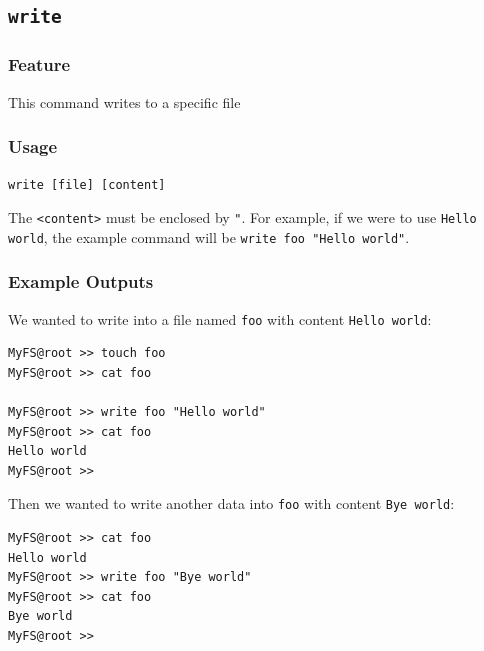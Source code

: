 \documentclass{homework}
\begin{document}
\subsection{\texttt{write}}
\subsubsection{Feature}
This command writes to a specific file
\subsubsection{Usage}
\begin{center}
\texttt{write [file] [content]}
\end{center}
The \texttt{<content>} must be enclosed by \texttt{"}. For example, if we were to use \texttt{Hello world}, the example command will be \texttt{write foo "Hello world"}.
\subsubsection{Example Outputs}
We wanted to write into a file named \texttt{foo} with content \texttt{Hello world}:
\\
\begin{center}
\begin{code}
\begin{verbatim}
MyFS@root >> touch foo
MyFS@root >> cat foo

MyFS@root >> write foo "Hello world"
MyFS@root >> cat foo
Hello world
MyFS@root >>
\end{verbatim}
\end{code}
\end{center}
Then we wanted to write another data into \texttt{foo} with content \texttt{Bye world}:
\\
\begin{center}
\begin{code}
\begin{verbatim}
MyFS@root >> cat foo
Hello world
MyFS@root >> write foo "Bye world"
MyFS@root >> cat foo
Bye world
MyFS@root >>
\end{verbatim}
\end{code}
\end{center}
\end{document}
